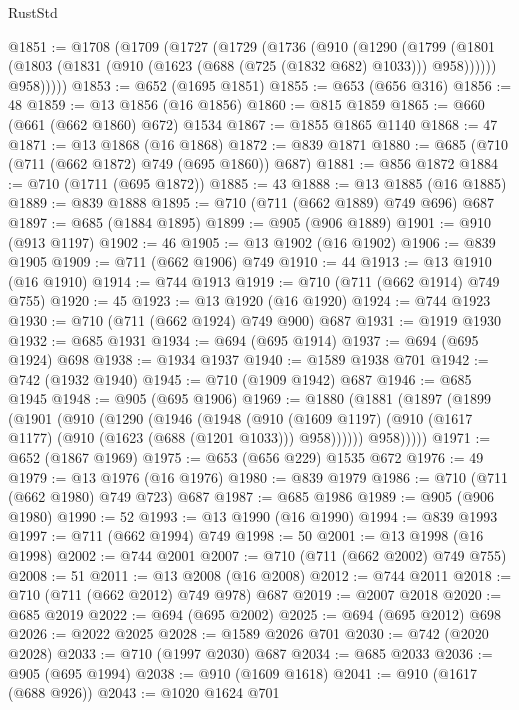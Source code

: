 \begin{lexlean}{RustStd}
\begin{coremodule}
@1851 := @1708
    (@1709
      (@1727
        (@1729
          (@1736
            (@910
              (@1290
                (@1799
                  (@1801 (@1803 (@1831 (@910 (@1623 (@688 (@725 (@1832 @682) @1033))) @958))))))
              @958)))))
@1853 := @652 (@1695 @1851)
@1855 := @653 (@656 @316)
@1856 := 48
@1859 := @13 @1856 (@16 @1856)
@1860 := @815 @1859
@1865 := @660 (@661 (@662 @1860) @672) @1534
@1867 := @1855 @1865 @1140
@1868 := 47
@1871 := @13 @1868 (@16 @1868)
@1872 := @839 @1871
@1880 := @685 (@710 (@711 (@662 @1872) @749 (@695 @1860)) @687)
@1881 := @856 @1872
@1884 := @710 (@1711 (@695 @1872))
@1885 := 43
@1888 := @13 @1885 (@16 @1885)
@1889 := @839 @1888
@1895 := @710 (@711 (@662 @1889) @749 @696) @687
@1897 := @685 (@1884 @1895)
@1899 := @905 (@906 @1889)
@1901 := @910 (@913 @1197)
@1902 := 46
@1905 := @13 @1902 (@16 @1902)
@1906 := @839 @1905
@1909 := @711 (@662 @1906) @749
@1910 := 44
@1913 := @13 @1910 (@16 @1910)
@1914 := @744 @1913
@1919 := @710 (@711 (@662 @1914) @749 @755)
@1920 := 45
@1923 := @13 @1920 (@16 @1920)
@1924 := @744 @1923
@1930 := @710 (@711 (@662 @1924) @749 @900) @687
@1931 := @1919 @1930
@1932 := @685 @1931
@1934 := @694 (@695 @1914)
@1937 := @694 (@695 @1924) @698
@1938 := @1934 @1937
@1940 := @1589 @1938 @701
@1942 := @742 (@1932 @1940)
@1945 := @710 (@1909 @1942) @687
@1946 := @685 @1945
@1948 := @905 (@695 @1906)
@1969 := @1880
    (@1881
      (@1897
        (@1899
          (@1901
            (@910
              (@1290
                (@1946
                  (@1948
                    (@910
                      (@1609 @1197)
                      (@910 (@1617 @1177) (@910 (@1623 (@688 (@1201 @1033))) @958))))))
              @958)))))
@1971 := @652 (@1867 @1969)
@1975 := @653 (@656 @229) @1535 @672
@1976 := 49
@1979 := @13 @1976 (@16 @1976)
@1980 := @839 @1979
@1986 := @710 (@711 (@662 @1980) @749 @723) @687
@1987 := @685 @1986
@1989 := @905 (@906 @1980)
@1990 := 52
@1993 := @13 @1990 (@16 @1990)
@1994 := @839 @1993
@1997 := @711 (@662 @1994) @749
@1998 := 50
@2001 := @13 @1998 (@16 @1998)
@2002 := @744 @2001
@2007 := @710 (@711 (@662 @2002) @749 @755)
@2008 := 51
@2011 := @13 @2008 (@16 @2008)
@2012 := @744 @2011
@2018 := @710 (@711 (@662 @2012) @749 @978) @687
@2019 := @2007 @2018
@2020 := @685 @2019
@2022 := @694 (@695 @2002)
@2025 := @694 (@695 @2012) @698
@2026 := @2022 @2025
@2028 := @1589 @2026 @701
@2030 := @742 (@2020 @2028)
@2033 := @710 (@1997 @2030) @687
@2034 := @685 @2033
@2036 := @905 (@695 @1994)
@2038 := @910 (@1609 @1618)
@2041 := @910 (@1617 (@688 @926))
@2043 := @1020 @1624 @701

\end{coremodule}
\end{lexlean}
